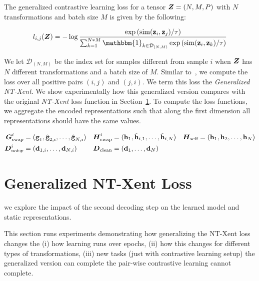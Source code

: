 \documentclass[11pt]{article}
\begin{document}
The generalized contrastive learning loss for a tensor $\boldsymbol{Z} = (N,M,P)$ with $N$ transformations and batch size $M$ is given by the following:

\begin{align}
  l_{i,j}(\mZ)
  =
  -\log
  \frac{
  \exp\left(\text{sim}(\vz_i,\vz_j)/\tau\right)
  }{
  \sum^{N*M}_{k=1}\mathbbm{1}_{k \in \mathcal{D}_{(N,M)}}\exp\left(\text{sim}(\vz_i,\vz_k)/\tau\right)
  }
\end{align}

We let $\mathcal{D}_{(N,M)}$ be the index set for samples different from sample $i$ when $\boldsymbol{Z}$ has $N$ different transformations and a batch size of $M$. Similar to~\cite{chen2020simple}, we compute the loss over all positive pairs $(i,j)$ and $(j,i)$. We term this loss the \emph{Generalized NT-Xent}.  We show experimentally how this generalized version compares with the original \emph{NT-Xent} loss function in Section~\ref{sec:gen_nt_xent}. To compute the loss functions, we aggregate the encoded representations such that along the first dimension all representations should have the same values.

\begin{align}\nonumber
  \boldsymbol{G}_{\text{swap}}^i &= (\boldsymbol{\mathrm{g}}_1,\hat{\boldsymbol{\mathrm{g}}}_{2,i},\ldots,\hat{\boldsymbol{\mathrm{g}}}_{N,i})                                 &
  \boldsymbol{H}_{\text{swap}}^i &= (\boldsymbol{\mathrm{h}}_1,\hat{\boldsymbol{\mathrm{h}}}_{i,1},\ldots,\hat{\boldsymbol{\mathrm{h}}}_{i,N}) & \boldsymbol{H}_{\text{self}} &= (\boldsymbol{\mathrm{h}}_1,\boldsymbol{\mathrm{h}}_2,\ldots,\boldsymbol{\mathrm{h}}_N)
   \\\nonumber                          
  \boldsymbol{D}_{\text{noisy}}^i &= (\boldsymbol{\mathrm{d}}_{1,i},\ldots,\boldsymbol{\mathrm{d}}_{N,i})
  &                     
  \boldsymbol{D}_{\text{clean}} &= (\boldsymbol{\mathrm{d}}_1,\ldots,\boldsymbol{\mathrm{d}}_N)
\end{align}

\newpage

\section{Generalized NT-Xent Loss}\label{sec:gen_nt_xent}

we explore the impact of the second decoding step on the learned model and static representations.

This section runs experiments demonstrating how generalizing the NT-Xent loss changes the (i) how learning runs over epochs, (ii) how this changes for different types of transformations, (iii) new tasks (just with contrastive learning setup) the generalized version can complete the pair-wise contrastive learning cannot complete.
\end{document}
